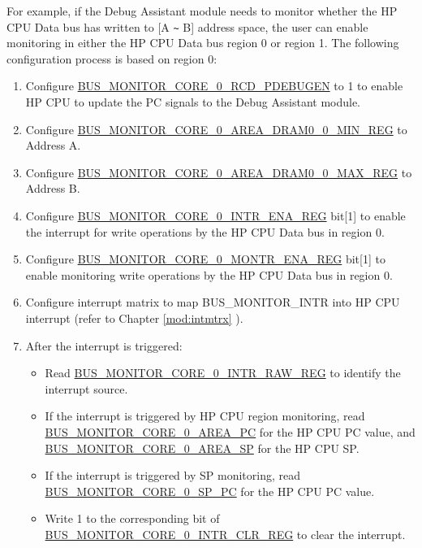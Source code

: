 \documentclass[main\_\_EN.tex]{subfiles}
\begin{document}
For example, if the Debug Assistant module needs to monitor whether the HP CPU Data bus has written to [A \verb+~+ B] address space, the user can enable monitoring in either the HP CPU Data bus region 0 or region 1. The following configuration process is based on region 0:

\begin{enumerate}
    \item Configure \hyperref[fielddesc:BUSMONITORCORE0RCDPDEBUGEN]{BUS\_MONITOR\_CORE\_0\_RCD\_PDEBUGEN} to 1 to enable HP CPU to update the PC signals to the Debug Assistant module.
    \item Configure \hyperref[regdesc:BUSMONITORCORE0AREADRAM00MINREG]{BUS\_MONITOR\_CORE\_0\_AREA\_DRAM0\_0\_MIN\_REG} to Address A.
    \item Configure \hyperref[regdesc:BUSMONITORCORE0AREADRAM00MAXREG]{BUS\_MONITOR\_CORE\_0\_AREA\_DRAM0\_0\_MAX\_REG} to Address B.
    \item Configure \hyperref[regdesc:BUSMONITORCORE0INTRENAREG]{BUS\_MONITOR\_CORE\_0\_INTR\_ENA\_REG} bit[1] to enable the interrupt for write operations by the HP CPU Data bus in region 0.
    \item Configure \hyperref[regdesc:BUSMONITORCORE0MONTRENAREG]{BUS\_MONITOR\_CORE\_0\_MONTR\_ENA\_REG} bit[1] to enable monitoring write operations by the HP CPU Data bus in region 0.
    \item Configure interrupt matrix to map BUS\_MONITOR\_INTR into HP CPU interrupt (refer to Chapter \ref{mod:intmtrx} \textit{}).
    \item After the interrupt is triggered:
        \begin{itemize}
            \item Read \hyperref[regdesc:BUSMONITORCORE0INTRRAWREG]{BUS\_MONITOR\_CORE\_0\_INTR\_RAW\_REG} to identify the interrupt source.
            \item If the interrupt is triggered by HP CPU region monitoring, read \hyperref[fielddesc:BUSMONITORCORE0AREAPC]{BUS\_MONITOR\_CORE\_0\_AREA\_PC} for the HP CPU PC value, and \hyperref[fielddesc:BUSMONITORCORE0AREASP]{BUS\_MONITOR\_CORE\_0\_AREA\_SP} for the HP CPU SP.
            \item If the interrupt is triggered by SP monitoring, read \hyperref[fielddesc:BUSMONITORCORE0SPPC]{BUS\_MONITOR\_CORE\_0\_SP\_PC} for the HP CPU PC value.
            \item Write 1 to the corresponding bit of \hyperref[regdesc:BUSMONITORCORE0INTRCLRREG]{BUS\_MONITOR\_CORE\_0\_INTR\_CLR\_REG} to clear the interrupt.
        \end{itemize}
\end{enumerate}
\end{document}
